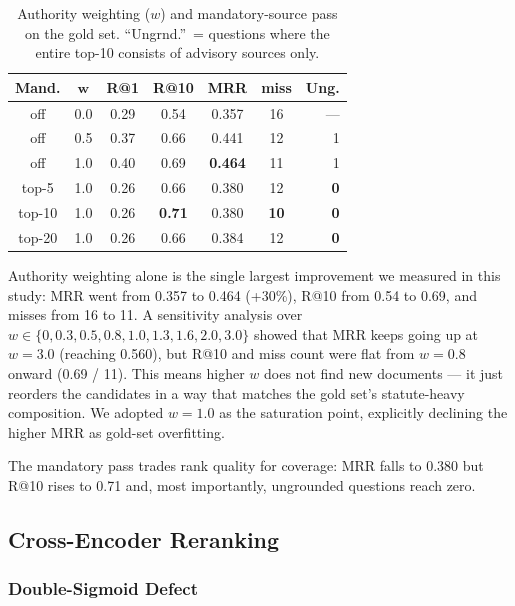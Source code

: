 \documentclass[11pt,a4paper,twocolumn]{article}
\begin{document}
\begin{table}[t]
\centering
\caption{Authority weighting ($w$) and mandatory-source pass on the gold set. ``Ungrnd.''\ = questions where the entire top-10 consists of advisory sources only.}
\label{tab:authority}
\small
\begin{tabular}{@{}ccccccr@{}}
\toprule
\textbf{Mand.} & $\boldsymbol{w}$ & \textbf{R@1} & \textbf{R@10} & \textbf{MRR} & \textbf{miss} & \textbf{Ung.} \\
\midrule
off    & 0.0 & 0.29 & 0.54 & 0.357 & 16 & --- \\
off    & 0.5 & 0.37 & 0.66 & 0.441 & 12 & 1 \\
off    & 1.0 & 0.40 & 0.69 & \textbf{0.464} & 11 & 1 \\
top-5  & 1.0 & 0.26 & 0.66 & 0.380 & 12 & \textbf{0} \\
top-10 & 1.0 & 0.26 & \textbf{0.71} & 0.380 & \textbf{10} & \textbf{0} \\
top-20 & 1.0 & 0.26 & 0.66 & 0.384 & 12 & \textbf{0} \\
\bottomrule
\end{tabular}
\end{table}

Authority weighting alone is the single largest improvement we measured in this study: MRR went from 0.357 to 0.464 (+30\%), R@10 from 0.54 to 0.69, and misses from 16 to 11. A sensitivity analysis over $w \in \{0, 0.3, 0.5, 0.8, 1.0, 1.3, 1.6, 2.0, 3.0\}$ showed that MRR keeps going up at $w{=}3.0$ (reaching 0.560), but R@10 and miss count were flat from $w{=}0.8$ onward (0.69 / 11). This means higher $w$ does not find new documents --- it just reorders the candidates in a way that matches the gold set's statute-heavy composition. We adopted $w{=}1.0$ as the saturation point, explicitly declining the higher MRR as gold-set overfitting.

The mandatory pass trades rank quality for coverage: MRR falls to 0.380 but R@10 rises to 0.71 and, most importantly, ungrounded questions reach zero.

\subsection{Cross-Encoder Reranking}
\label{subsec:sigmoid}

\subsubsection{Double-Sigmoid Defect}
\end{document}
